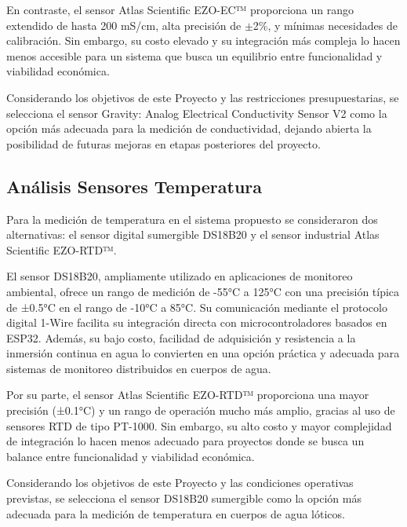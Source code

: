 En contraste, el sensor Atlas Scientific EZO-EC™ proporciona un rango extendido de hasta 200 mS/cm, alta precisión de $\pm$2\%, y mínimas necesidades de calibración. Sin embargo, su costo elevado y su integración más compleja lo hacen menos accesible para un sistema que busca un equilibrio entre funcionalidad y viabilidad económica.

Considerando los objetivos de este Proyecto y las restricciones presupuestarias, se selecciona el sensor Gravity: Analog Electrical Conductivity Sensor V2 como la opción más adecuada para la medición de conductividad, dejando abierta la posibilidad de futuras mejoras en etapas posteriores del proyecto.

\subsection{Análisis Sensores Temperatura}
\label{subsec:analisis_sensores_temperatura}


Para la medición de temperatura en el sistema propuesto se consideraron dos alternativas: el sensor digital sumergible DS18B20 y el sensor industrial Atlas Scientific EZO-RTD™.

El sensor DS18B20, ampliamente utilizado en aplicaciones de monitoreo ambiental, ofrece un rango de medición de -55°C a 125°C con una precisión típica de ±0.5°C en el rango de -10°C a 85°C. Su comunicación mediante el protocolo digital 1-Wire facilita su integración directa con microcontroladores basados en ESP32. Además, su bajo costo, facilidad de adquisición y resistencia a la inmersión continua en agua lo convierten en una opción práctica y adecuada para sistemas de monitoreo distribuidos en cuerpos de agua.

Por su parte, el sensor Atlas Scientific EZO-RTD™ proporciona una mayor precisión (±0.1°C) y un rango de operación mucho más amplio, gracias al uso de sensores RTD de tipo PT-1000. Sin embargo, su alto costo y mayor complejidad de integración lo hacen menos adecuado para proyectos donde se busca un balance entre funcionalidad y viabilidad económica.

Considerando los objetivos de este Proyecto y las condiciones operativas previstas, se selecciona el sensor DS18B20 sumergible como la opción más adecuada para la medición de temperatura en cuerpos de agua lóticos.

